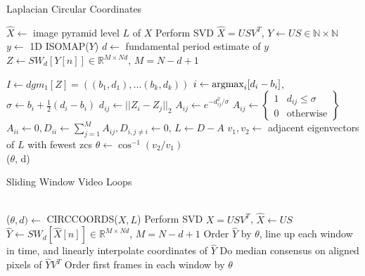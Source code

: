 \documentclass{article}
\newcommand{\argmax}{\operatornamewithlimits{argmax}}
\begin{document}
\begin{algorithm}[t]
    \caption{Laplacian Circular Coordinates}
    \begin{algorithmic}[1]
    \State $\hat{X} \gets $ image pyramid level $L$ of $X$
    \State Perform SVD $\hat{X} = USV^T$, $Y \gets US \in \mathbb{N \times N}$
    \State $y \gets$ 1D ISOMAP($Y$)
    \State $d \gets$ fundamental period estimate of $y$
    \State $Z \gets SW_{d}[Y[n]] \in \mathbb{R}^{M \times Nd}$, $M = N-d+1$

    \State $I \gets dgm_1[Z] = ((b_1, d_1), ... (b_k, d_k))$
    \State $i \gets \argmax_{i}[d_i - b_i]$, $\sigma \gets b_i + \frac{1}{2}(d_i - b_i)$
    \State $d_{ij} \gets ||Z_i - Z_j||_2$
        \State $A_{ij} \gets e^{-d_{ij}^2/\sigma}$
    \Else
        \State $A_{ij} \gets \left\{ \begin{array}{cc} 1 & d_{ij} \leq \sigma \\ 0 & \text{otherwise} \end{array} \right\}$
    \EndIf
    \State $A_{ii} \gets 0, D_{ii} \gets \sum_{j=1}^M A_{ij}, D_{i, j \neq i} \gets 0$, $L \gets D - A$
    \State $v_1, v_2 \gets $ adjacent eigenvectors of $L$ with fewest zcs
    \State $\theta \gets \cos^{-1}(v_2/v_1)$\\
    \Return ($\theta$, d)
    \EndProcedure
  \end{algorithmic}
\end{algorithm}

\begin{algorithm}[t]
  \caption{Sliding Window Video Loops}\label{alg:videoreordering}
  \begin{algorithmic}[1]
     \\
    \State ($\theta, d) \gets$ CIRCCOORDS($X, L$)
    \State Perform SVD $X = USV^T$, $\hat{X} \gets US$
    \State $\hat{Y} \gets SW_d[\hat{X}[n]] \in \mathbb{R}^{M \times Nd}$, $M = N-d+1$
        \State Order $\hat{Y}$ by $\theta$, line up each window in time, and linearly interpolate coordinates of $\hat{Y}$
        \State Do median consensus on aligned pixels of $\hat{Y}V^T$ \label{algline:medianconsensus}
    \Else
        \State Order first frames in each window by $\theta$
    \EndIf
    \EndProcedure
  \end{algorithmic}
\end{algorithm}
\end{document}
